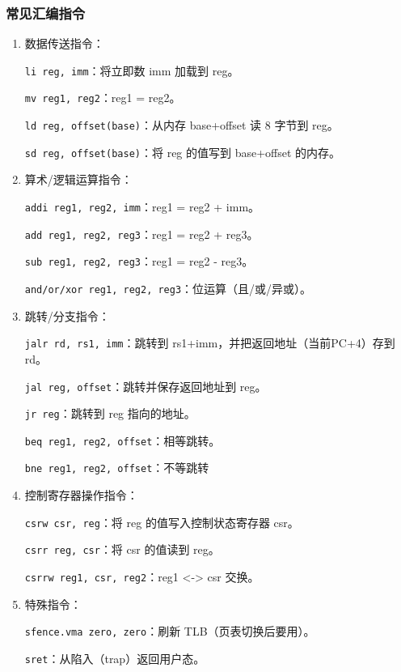 \subsubsection{常见汇编指令}

\begin{enumerate}
	
	\item 数据传送指令：
	
	\texttt{li reg, imm}：将立即数 imm 加载到 reg。
	
	\texttt{mv reg1, reg2}：reg1 = reg2。
	
	\texttt{ld reg, offset(base)}：从内存 base+offset 读 8 字节到 reg。
	
	\texttt{sd reg, offset(base)}：将 reg 的值写到 base+offset 的内存。
	
	\item 算术/逻辑运算指令：
	
	\texttt{addi reg1, reg2, imm}：reg1 = reg2 + imm。
	
	\texttt{add reg1, reg2, reg3}：reg1 = reg2 + reg3。
	
	\texttt{sub reg1, reg2, reg3}：reg1 = reg2 - reg3。
	
	\texttt{and/or/xor reg1, reg2, reg3}：位运算（且/或/异或）。
	
	\item 跳转/分支指令：
	
	\texttt{jalr rd, rs1, imm}：跳转到 rs1+imm，并把返回地址（当前PC+4）存到 rd。
	
	\texttt{jal reg, offset}：跳转并保存返回地址到 reg。
	
	\texttt{jr reg}：跳转到 reg 指向的地址。
	
	\texttt{beq reg1, reg2, offset}：相等跳转。
	
	\texttt{bne reg1, reg2, offset}：不等跳转
	
	\item 控制寄存器操作指令：
	
	\texttt{csrw csr, reg}：将 reg 的值写入控制状态寄存器 csr。
	
	\texttt{csrr reg, csr}：将 csr 的值读到 reg。
	
	\texttt{csrrw reg1, csr, reg2}：reg1 \textless-\textgreater{} csr 交换。
	
	\item 特殊指令：
	
	\texttt{sfence.vma zero, zero}：刷新 TLB（页表切换后要用）。
	
	\texttt{sret}：从陷入（trap）返回用户态。
\end{enumerate}

